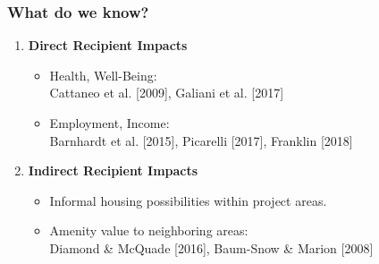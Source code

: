 \documentclass[aspectratio=32]{beamer}
\begin{document}
\begin{frame}
\frametitle{What do we know?}
\centering

\begin{enumerate}
  \item<1-> {\bf Direct Recipient Impacts}
  \vspace{2mm}
  \begin{itemize}
      \item {Health, Well-Being}: \\ Cattaneo et al. [2009], Galiani et al. [2017]
      \vspace{2mm}
      \item {Employment, Income}: \\ Barnhardt et al. [2015], Picarelli [2017], Franklin [2018]
    \end{itemize}
  \vspace{2mm}
  \item<2-> {\bf Indirect Recipient Impacts}
  \begin{itemize}
  \vspace{2mm}
      \item Informal housing possibilities within project areas.
      \vspace{2mm}
      \item Amenity value to neighboring areas: \\ Diamond \& McQuade [2016], Baum-Snow \& Marion [2008]
    \end{itemize}
\end{enumerate}

\end{frame}
\end{document}
